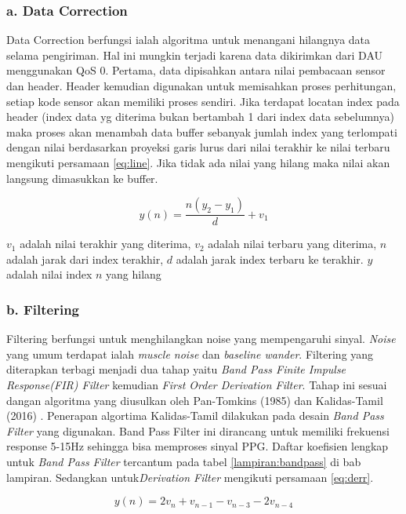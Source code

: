 \subsubsection{a. Data Correction}
Data Correction berfungsi ialah algoritma untuk menangani hilangnya data selama pengiriman. Hal ini mungkin terjadi karena data dikirimkan dari DAU menggunakan QoS 0. Pertama, data dipisahkan antara nilai pembacaan sensor dan header. Header kemudian digunakan untuk memisahkan proses perhitungan, setiap kode sensor akan memiliki proses sendiri. Jika terdapat locatan index pada header (index data yg diterima bukan bertambah 1 dari index data sebelumnya) maka proses akan menambah data buffer sebanyak jumlah index yang terlompati dengan nilai berdasarkan proyeksi garis lurus dari nilai terakhir ke nilai terbaru mengikuti persamaan \ref{eq:line}. Jika tidak ada nilai yang hilang maka nilai akan langsung dimasukkan ke buffer.

\begin{equation}
y(n) = \dfrac{n (y_{2} - y_{1})}{d} + v_{1}
\label{eq:line}
\end{equation}

$v_{1}$ adalah nilai terakhir yang diterima, $v_{2}$ adalah nilai terbaru yang diterima, $n$ adalah jarak dari index terakhir, $d$ adalah jarak index terbaru ke terakhir. $y$ adalah nilai index $n$ yang hilang

\subsubsection{b. Filtering}
Filtering berfungsi untuk menghilangkan noise yang mempengaruhi sinyal. \textit{Noise} yang umum terdapat ialah \textit{muscle noise} dan \textit{baseline wander}. Filtering yang diterapkan terbagi menjadi dua tahap yaitu \textit{Band Pass Finite Impulse Response(FIR) Filter} kemudian \textit{First Order Derivation Filter}. Tahap ini sesuai dangan algoritma yang diusulkan oleh Pan-Tomkins (1985)\cite{pantom} dan Kalidas-Tamil (2016) \cite{ecg_syncro}. Penerapan algortima Kalidas-Tamil dilakukan pada desain \textit{Band Pass Filter} yang digunakan. Band Pass Filter ini dirancang untuk memiliki frekuensi response 5-15Hz sehingga bisa memproses sinyal PPG. Daftar koefisien lengkap untuk \textit{Band Pass Filter} tercantum pada tabel \ref{lampiran:bandpass} di bab lampiran. Sedangkan untuk\textit{Derivation Filter} mengikuti persamaan \ref{eq:derr}.

\begin{equation}
y(n) = 2v_{n} + v_{n-1} - v_{n-3} - 2v_{n-4}
\label{eq:derr}
\end{equation}

